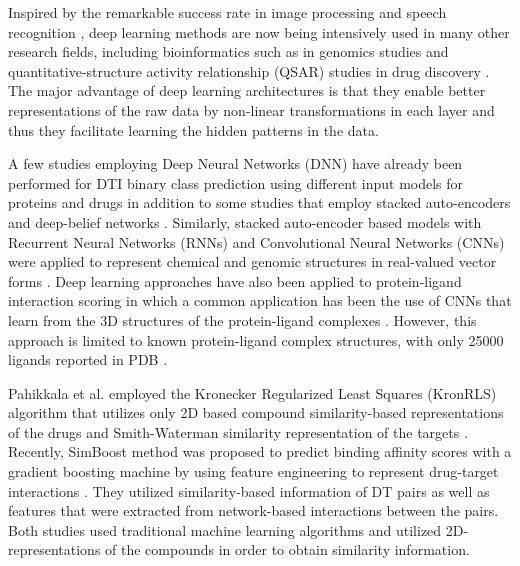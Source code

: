 \documentclass[11pt,letterpaper]{article}
\begin{document}
Inspired by the remarkable success rate in image processing \cite{ciregan2012multi, donahue2014decaf, simonyan2014very} and speech recognition \cite{hinton2012deepspeech, dahl2012context, graves2013speech}, deep learning methods are now being intensively used in many other research fields, including bioinformatics such as in genomics studies \cite{leung2014deep, xiong2015human} and quantitative-structure activity relationship (QSAR) studies in drug discovery \cite{ma2015deep}. The major advantage of deep learning architectures is that they enable better representations of the raw data by non-linear transformations in each layer \cite{lecun2015deep} and thus they facilitate learning the hidden patterns in the data. 

A few studies employing Deep Neural Networks (DNN) have already been performed for DTI binary class prediction using different input models for proteins and drugs \cite{tian2015boosting, chan2016large, hamanaka2016cgbvs} in addition to some studies that employ stacked auto-encoders \cite{wang2017computational} and deep-belief networks \cite{wen2017deep}. Similarly, stacked auto-encoder based models with Recurrent Neural Networks (RNNs) and Convolutional Neural Networks (CNNs) were applied to represent chemical and genomic structures in real-valued vector forms \cite{gomez2016automatic, jastrzkebski2016learning}.  Deep learning approaches have also been applied to protein-ligand interaction scoring in which  a common application has been the use of CNNs that learn from the 3D structures of the protein-ligand complexes \cite{wallach2015atomnet, ragoza2017protein, gomes2017atomic}. However, this approach is limited to known protein-ligand complex structures, with only 25000 ligands reported in PDB \cite{rose2016rcsb}. 

Pahikkala et al. employed the Kronecker Regularized Least Squares (KronRLS) algorithm that  utilizes only 2D based compound similarity-based representations of the drugs and Smith-Waterman similarity representation of the targets \cite{pahikkala2014toward}.  Recently, SimBoost method was  proposed to predict binding affinity scores with a gradient boosting machine by using feature engineering to represent drug-target interactions \cite{he2017simboost}. They utilized similarity-based information of DT pairs as well as features that were extracted from network-based interactions between the pairs. Both studies used traditional machine learning algorithms and utilized 2D-representations of the compounds in order to obtain similarity information.
\end{document}
